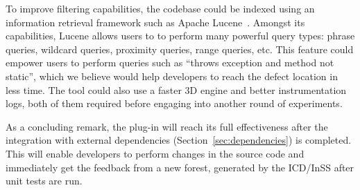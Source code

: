 To improve filtering capabilities, the codebase could be indexed using an
information retrieval framework such as Apache Lucene~\cite{lucene2005apache}.
Amongst its capabilities, Lucene allows users to to perform many powerful query
types: phrase queries, wildcard queries, proximity queries, range queries, etc.
This feature could empower users to perform queries such as ``throws exception
and method not static'', which we believe would help developers to reach the
defect location in less time. The tool could also use a faster 3D engine and
better instrumentation logs, both of them required before engaging into another
round of experiments.

As a concluding remark, the plug-in will reach its full effectiveness after the
integration with external dependencies (Section~\ref{sec:dependencies}) is
completed. This will enable developers to perform changes in the source code and
immediately get the feedback from a new forest, generated by the ICD/InSS after
unit tests are run.
